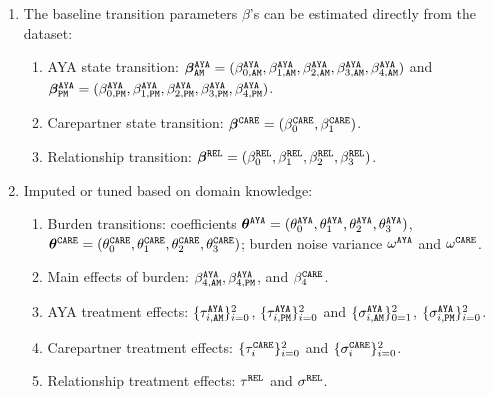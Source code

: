 \begin{enumerate}
\item The baseline transition parameters $\beta$'s can be estimated directly from the dataset:
    \begin{enumerate}
        \item AYA state transition: ${\bm{\beta}}^{\tiny\texttt{AYA}}_{{\texttt{AM}}} = (\beta_{0, {\texttt{AM}}}^{\tiny\texttt{AYA}}, \beta_{1, {\texttt{AM}}}^{\tiny\texttt{AYA}}, \beta_{2, {\texttt{AM}}}^{\tiny\texttt{AYA}}, \beta_{3, {\texttt{AM}}}^{\tiny\texttt{AYA}}, \beta_{4, {\texttt{AM}}}^{\tiny\texttt{AYA}})$ and ${\bm{\beta}}^{\tiny\texttt{AYA}}_{{\texttt{PM}}} = (\beta_{0, {\texttt{PM}}}^{\tiny\texttt{AYA}}, \beta_{1, {\texttt{PM}}}^{\tiny\texttt{AYA}}, \beta_{2, {\texttt{PM}}}^{\tiny\texttt{AYA}}, \beta_{3, {\texttt{PM}}}^{\tiny\texttt{AYA}}, \beta_{4, {\texttt{PM}}}^{\tiny\texttt{AYA}})$.
        \item Carepartner state transition: ${\bm{\beta}}^{\tiny\texttt{CARE}} = (\beta_{0}^{\tiny\texttt{CARE}}, \beta_{1}^{\tiny\texttt{CARE}})$.
        \item Relationship transition: ${\bm{\beta}}^{\tiny\texttt{REL}} = (\beta_{0}^{\tiny\texttt{REL}}, \beta_{1}^{\tiny\texttt{REL}}, \beta_{2}^{\tiny\texttt{REL}}, \beta_{3}^{\tiny\texttt{REL}})$.
    \end{enumerate}
\item Imputed or tuned based on domain knowledge:
    \begin{enumerate}
        \item Burden transitions: coefficients $\boldsymbol{\theta}^{\tiny\texttt{AYA}} = (\theta^{\tiny\texttt{AYA}}_{0}, \theta^{\tiny\texttt{AYA}}_{1}, \theta^{\tiny\texttt{AYA}}_{2}, \theta^{\tiny\texttt{AYA}}_{3})$, $\boldsymbol{\theta}^{\tiny\texttt{CARE}} = (\theta^{\tiny\texttt{CARE}}_{0}, \theta^{\tiny\texttt{CARE}}_{1}, \theta^{\tiny\texttt{CARE}}_{2}, \theta^{\tiny\texttt{CARE}}_{3})$; burden noise variance $\omega^{\tiny\texttt{AYA}}$ and $\omega^{\tiny\texttt{CARE}}$.
        \item Main effects of burden: $\beta_{4, {\texttt{AM}}}^{\tiny\texttt{AYA}}, \beta_{4, {\texttt{PM}}}^{\tiny\texttt{AYA}}$, and $\beta_{4}^{\tiny\texttt{CARE}}$.
        \item AYA treatment effects: $\{\tau_{i, {\texttt{AM}}}^{\tiny\texttt{AYA}}\}_{i = 0}^{2}$, $\{\tau_{i, {\texttt{PM}}}^{\tiny\texttt{AYA}}\}_{i = 0}^{2}$ and $\{\sigma_{i, {\texttt{AM}}}^{\tiny\texttt{AYA}}\}_{0 = 1}^{2}$, $\{\sigma_{i, {\texttt{PM}}}^{\tiny\texttt{AYA}}\}_{i = 0}^{2}$.
        \item Carepartner treatment effects: $\{\tau_{i}^{\tiny\texttt{CARE}}\}_{i = 0}^{2}$ and $\{\sigma_{i}^{\tiny\texttt{CARE}}\}_{i = 0}^{2}$.
        \item Relationship treatment effects: $\tau^{\tiny\texttt{REL}}$ and $\sigma^{\tiny\texttt{REL}}$.
    \end{enumerate}
\end{enumerate}


